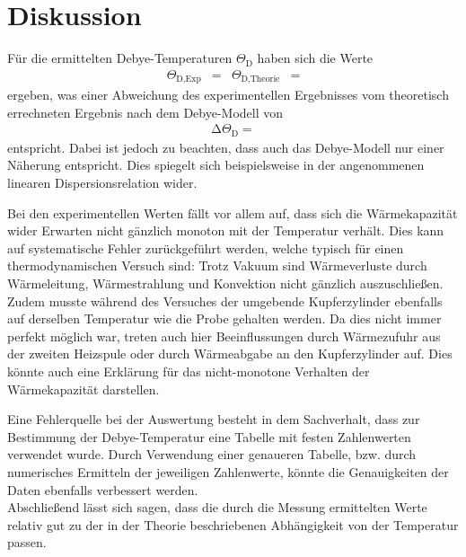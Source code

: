 \section{Diskussion}
\label{sec:Diskussion}

Für die ermittelten Debye-Temperaturen $\Theta_\text{D}$ haben sich die Werte
\begin{align*}
  \Theta_{\text{D,Exp}} &=  & \Theta_{\text{D,Theorie}} &= 
\end{align*}
ergeben, was einer Abweichung des experimentellen Ergebnisses vom theoretisch errechneten Ergebnis nach dem Debye-Modell von
\begin{align*}
  \increment \Theta_\text{D} = 
\end{align*}
entspricht.
Dabei ist jedoch zu beachten, dass auch das Debye-Modell nur einer Näherung entspricht.
Dies spiegelt sich beispielsweise in der angenommenen linearen Dispersionsrelation wider.

Bei den experimentellen Werten fällt vor allem auf, dass sich die Wärmekapazität wider Erwarten nicht gänzlich monoton mit der Temperatur verhält.
Dies kann auf systematische Fehler zurückgeführt werden, welche typisch für einen thermodynamischen Versuch sind:
Trotz Vakuum sind Wärmeverluste durch Wärmeleitung, Wärmestrahlung und Konvektion nicht gänzlich auszuschließen.
Zudem musste während des Versuches der umgebende Kupferzylinder ebenfalls auf derselben Temperatur wie die Probe gehalten werden.
Da dies nicht immer perfekt möglich war, treten auch hier Beeinflussungen durch Wärmezufuhr aus der zweiten Heizspule oder durch Wärmeabgabe an den Kupferzylinder auf.
Dies könnte auch eine Erklärung für das nicht-monotone Verhalten der Wärmekapazität darstellen.

Eine Fehlerquelle bei der Auswertung besteht in dem Sachverhalt, dass zur Bestimmung der Debye-Temperatur eine Tabelle mit festen Zahlenwerten verwendet wurde.
Durch Verwendung einer genaueren Tabelle, bzw. durch numerisches Ermitteln der jeweiligen Zahlenwerte, könnte die Genauigkeiten der Daten ebenfalls verbessert werden.\\
Abschließend lässt sich sagen, dass die durch die Messung ermittelten Werte relativ gut zu der in der Theorie beschriebenen Abhängigkeit von der Temperatur passen.
